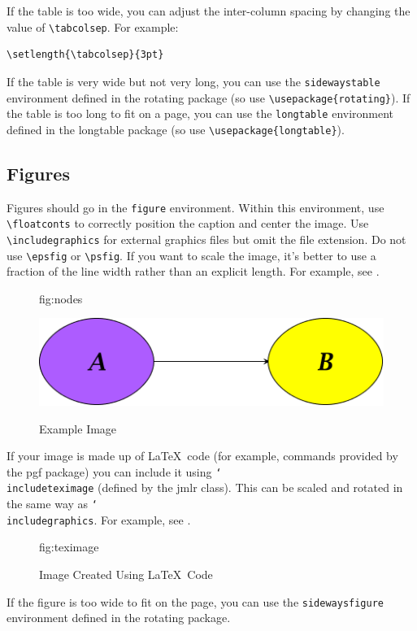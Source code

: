 \documentclass[pmlr,twocolumn,10pt]{jmlr} %
\newcommand{\cs}[1]{\texttt{\char`\\#1}}%
\begin{document}
If the table is too wide, you can adjust the inter-column
spacing by changing the value of \verb|\tabcolsep|. For
example:
\begin{verbatim}
\setlength{\tabcolsep}{3pt}
\end{verbatim}
If the table is very wide but not very long, you can use the
\texttt{sidewaystable} environment defined in the
\textsf{rotating} package (so use \verb|\usepackage{rotating}|).
If the table is too long to fit on a page, you can use the
\texttt{longtable} environment defined in the \textsf{longtable}
package (so use \verb|\usepackage{longtable}|).

\subsection{Figures}
\label{sec:figures}

Figures should go in the \texttt{figure} environment. Within this
environment, use \verb|\floatconts| to correctly position the
caption and center the image. Use \verb|\includegraphics|
for external graphics files but omit the file extension. Do not
use \verb|\epsfig| or \verb|\psfig|. If you want to scale the
image, it's better to use a fraction of the line width rather
than an explicit length. For example, see .

\begin{figure}[htbp]
\floatconts
  {fig:nodes}
  {\caption{Example Image}}
  {\includegraphics[width=0.5\linewidth]{images/nodes}}
\end{figure}

If your image is made up of \LaTeX\ code (for example, commands
provided by the \textsf{pgf} package) you can include it using
\cs{includeteximage} (defined by the \textsf{jmlr} class). This
can be scaled and rotated in the same way as \cs{includegraphics}.
For example, see .

\begin{figure}[htbp]
\floatconts
  {fig:teximage}
  {\caption{Image Created Using \LaTeX\ Code}}
  {}
\end{figure}

If the figure is too wide to fit on the page, you can use the
\texttt{sidewaysfigure} environment defined in the
\textsf{rotating} package.
\end{document}
